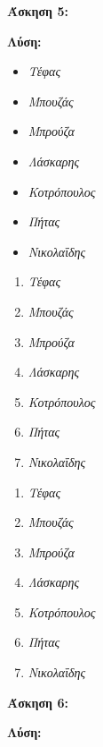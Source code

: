 \documentclass{article}
\begin{document}
\textbf{\large{Άσκηση 5: }}\\
\par
\textbf{\large{Λύση:}}

\begin{itemize}
    \item \textit{Τέφας}
    \item \textit{Μπουζάς}
    \item \textit{Μπρούζα}
    \item \textit{Λάσκαρης}
    \item \textit{Κοτρόπουλος}
    \item \textit{Πήτας}
    \item \textit{Νικολαΐδης}
\end{itemize}

\begin{enumerate}
    \item \textit{Τέφας}
    \item \textit{Μπουζάς}
    \item \textit{Μπρούζα}
    \item \textit{Λάσκαρης}
    \item \textit{Κοτρόπουλος}
    \item \textit{Πήτας}
    \item \textit{Νικολαΐδης}
\end{enumerate}

\begin{enumerate}[label=\textbf{(\greek*)}]
        \item \textit{Τέφας}
        \item \textit{Μπουζάς}
        \item \textit{Μπρούζα} 
        \item \textit{Λάσκαρης}
        \item \textit{Κοτρόπουλος}
        \item \textit{Πήτας}
        \item \textit{Νικολαΐδης}
    \end{enumerate}



\newpage

\textbf{\large{Άσκηση 6:}}\\
\par
\textbf{\large{Λύση: }}
\end{document}
